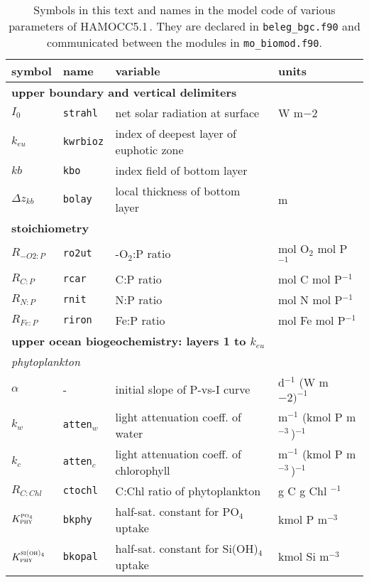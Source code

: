 \documentclass[11pt,a4paper,fleqn,twoside]{article}
\def\pho{\text{\textsc{po$_4$}}\,}
\def\sio{\text{\textsc{si(oh)$_4$}}\,}
\def\phy{\text{\textsc{phy}}\,}
\newcommand{\concP}{kmol P m$^{-3}$\,}
\newcommand{\concSi}{kmol Si m$^{-3}$\,}
\newcommand{\ham}{HAMOCC5.1\,}
\begin{document}
\begin{table}[htb]
{\caption{\label{tab_bgc_params}  Symbols in this text and names in the model code
of various parameters of \ham. They are declared in {\tt beleg\_bgc.f90} and communicated
between the modules in {\tt mo\_biomod.f90}.}}
\vspace{-.2cm}
\begin{center}
\renewcommand{\baselinestretch}{1}
\footnotesize
\begin{tabular}{llp{7cm}l} \hline 
symbol & name & variable & units \\ \hline
\multicolumn{4}{l}{\rule{0mm}{4mm}{\bf upper boundary and vertical delimiters}}\\ \hline
$I_0$ &{\tt strahl}& net solar radiation at surface& W m${-2}$\\ 
$k_{eu}$ &{\tt kwrbioz}  &index of deepest layer of euphotic zone & \\
$kb$ &{\tt kbo}& index field of bottom layer & \\
$\Delta z_{kb}$ &{\tt bolay}&  local thickness of bottom layer & m\\
\multicolumn{4}{l}{\rule{0mm}{4mm}\bf stoichiometry}\\ \hline
$R_{-O2:P}$ &{\tt ro2ut}& -O$_2$:P  ratio & mol O$_2$ mol P$^{-1}$\\
$R_{C:P}$&{\tt rcar}& C:P  ratio &mol C mol P$^{-1}$\\
$R_{N:P}$&{\tt rnit}& N:P  ratio &mol N mol P$^{-1}$\\
$R_{Fe:P}$&{\tt riron}& Fe:P  ratio &mol Fe mol P$^{-1}$\\
\multicolumn{4}{l}{\rule{0mm}{4mm}\bf upper ocean biogeochemistry: layers
1 to $k_{eu}$}\\
 \hline
\multicolumn{4}{l}{\rule{0mm}{4mm}\it phytoplankton}\\
$\alpha$  & - & initial slope of P-vs-I curve & d$^{-1}$ (W m${-2})^{-1}$\\
$k_w$&{\tt atten$_w$ }& light attenuation coeff. of water & m$^{-1}$ (\concP)$^{-1}$\\
$k_c$&{\tt atten$_c$ }& light attenuation coeff. of chlorophyll & m$^{-1}$ (\concP)$^{-1}$\\
$R_{C:Chl}$&{\tt ctochl }& C:Chl ratio of phytoplankton  & g C g Chl $^{-1}$\\
$K_{\phy}^{\pho}$&{\tt bkphy}& half-sat. constant for PO$_4$ uptake & \concP \\
$K_{\phy}^{\sio}$&{\tt bkopal}& half-sat. constant for Si(OH)$_4$ uptake & \concSi \\

\end{tabular}
\end{center}
\end{table}
\end{document}
